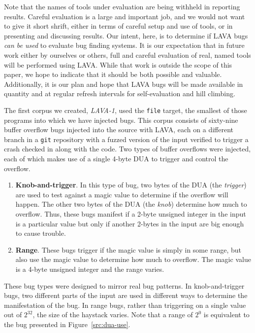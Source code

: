 Note that the names of tools under evaluation are being withheld in reporting results.
Careful evaluation is a large and important job, and we would not want to give it short shrift, either in terms of careful setup and use of tools, or in presenting and discussing results.
Our intent, here, is to determine if LAVA bugs \emph{can be used} to evaluate bug finding systems. 
It is our expectation that in future work either by ourselves or others, full and careful evaluation of real, named tools will be performed using LAVA.
While that work is outside the scope of this paper, we hope to indicate that it should be both possible and valuable. 
Additionally, it is our plan and hope that LAVA bugs will be made available in quantity and at regular refresh intervals for self-evaluation and hill climbing.

The first corpus we created, \emph{LAVA-1}, used the \verb+file+ target, the smallest of those programs into which we have injected bugs.
This corpus consists of sixty-nine buffer overflow bugs injected into the source with LAVA, each on a different branch in a \verb+git+ repository with a fuzzed version of the input verified to trigger a crash checked in along with the code.
Two types of buffer overflows were injected, each of which makes use of a single 4-byte DUA to trigger and control the overflow.

\begin{enumerate}
    \item \textbf{Knob-and-trigger}. 
In this type of bug, two bytes of the DUA (the \emph{trigger}) are used to test against a magic value to determine if the overflow will happen.
The other two bytes of the DUA (the \emph{knob}) determine how much to overflow. 
Thus, these bugs manifest if a 2-byte unsigned integer in the input is a particular value but only if another 2-bytes in the input are big enough to cause trouble. 
    \item \textbf{Range}. 
These bugs trigger if the magic value is simply in some range, but also use the magic value to determine how much to overflow.
The magic value is a 4-byte unsigned integer and the range varies.  
\end{enumerate}

These bug types were designed to mirror real bug patterns.  
In knob-and-trigger bugs, two different parts of the input are used in different ways to determine the manifestation of the bug.  
In range bugs, rather than triggering on a single value out of $2^{32}$, the size of the haystack varies.
Note that a range of $2^0$ is equivalent to the bug presented in Figure~\ref{src:dua-use}.

